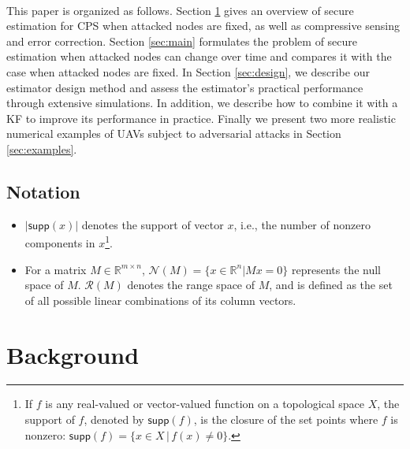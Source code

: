 \documentclass[twocolumn]{autart}    %
\newcommand{\norm}[1]{\left\lVert#1\right\rVert}
\newcommand{\rev}[1]{{\normalsize{{{\color{blue}#1}}}}}
\begin{document}
\\
This paper is organized as follows. Section \ref{sec:overview} gives an overview of secure estimation for CPS when attacked nodes are fixed, as well as compressive sensing and error correction. Section \ref{sec:main} formulates the problem of secure estimation when attacked nodes can change over time and compares it with the case when attacked nodes are fixed. In Section \ref{sec:design}, we describe our \rev{estimator} design method and assess the \rev{estimator}'s practical performance through extensive simulations. In addition, we describe how to combine it with a KF to improve its performance in practice. Finally we present two more realistic numerical examples of UAVs subject to adversarial attacks in Section \ref{sec:examples}. 
\vspace{-0.4cm}
\subsection{Notation}
\vspace{-0.4cm}
\begin{itemize}
\item 
$\lvert \textsf{supp} (x) \rvert $  denotes the support of vector $x$, i.e., the number of nonzero components in $x$\footnote{If $f$ is any real-valued or vector-valued function on a topological space $X$, the support of $f$, denoted by $\textsf{supp}(f)$, is the closure of the set points where $f$ is nonzero: $\textsf{supp}(f)  = \{ x \in X \,|\, f(x) \neq 0 \}$.}. 
\item  
For a matrix $M \in \mathbb{R}^{m \times n}$, $\mathcal{N} (M) = \{ x \in \mathbb{R}^n \lvert M x = 0 \}$ represents the null space of $M$. $\mathcal{R}(M)$ denotes the range space of $M$, and is defined as the set of all possible linear combinations of its column vectors.
\end{itemize}

\vspace{-0.4cm}
\section{Background}\label{sec:overview} 
\vspace{-0.4cm}
\end{document}
